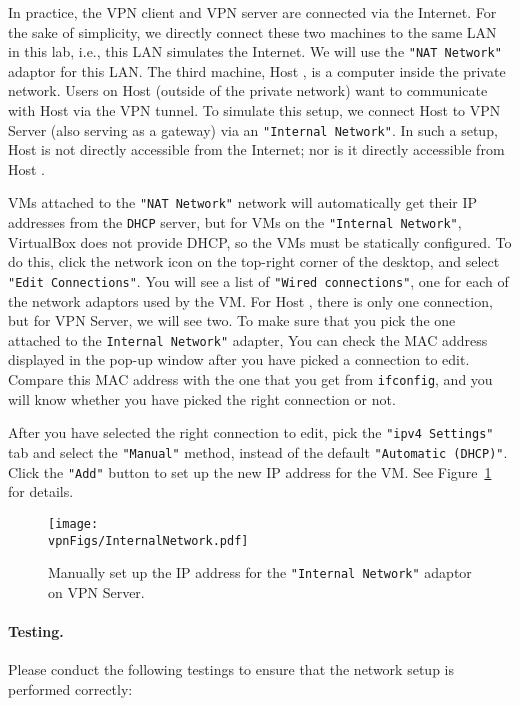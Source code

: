 In practice, the VPN client and VPN server are connected via the Internet.
For the sake of simplicity, we directly connect these two
machines to the same LAN in this lab, i.e., this LAN simulates the Internet. 
We will use the \texttt{"NAT Network"} adaptor for this LAN.
The third machine, Host \hostv, is a computer inside the private network. Users
on Host \hostu (outside of the private network) want to communicate with Host \hostv 
via the VPN tunnel. To simulate this setup, we connect Host \hostv to VPN Server
(also serving as a gateway) via an \texttt{"Internal Network"}.  In such a setup, 
Host \hostv is not directly accessible from the Internet; nor is it directly accessible 
from Host \hostu. 

VMs attached to the \texttt{"NAT Network"} network will automatically get their
IP addresses from the \texttt{DHCP} server, but for
VMs on the \texttt{"Internal Network"}, VirtualBox does not provide DHCP, so the
VMs must be statically configured. To do this, click the network icon on the top-right corner
of the desktop, and select \texttt{"Edit Connections"}. You will see a list
of \texttt{"Wired connections"}, one for each of the network adaptors used by the VM.
For Host \hostv, there is only one connection, but for VPN Server, we will see two. To make sure 
that you pick the one attached to the \texttt{Internal Network"} adapter, 
You can check the MAC address displayed in the pop-up window after you have 
picked a connection to edit. 
Compare this MAC address with the one that you get from \texttt{ifconfig},
and you will know whether you have picked the right connection or not. 


After you have selected the right connection to edit, 
pick the \texttt{"ipv4 Settings"} tab and select the 
\texttt{"Manual"} method, instead of the default \texttt{"Automatic (DHCP)"}. Click 
the \texttt{"Add"} button to set up the new IP address for the VM. See
Figure~\ref{vpn:fig:internalnetwork} for details. 



\begin{figure}[htb]
\begin{center}
\texttt{[image: \\vpnFigs/InternalNetwork.pdf]}
\end{center}
\caption{Manually set up the IP address for the \texttt{"Internal Network"} adaptor on VPN
Server.}
\label{vpn:fig:internalnetwork}
\end{figure}
 


\paragraph{Testing.} Please conduct the following testings to ensure that the 
network setup is performed correctly:

